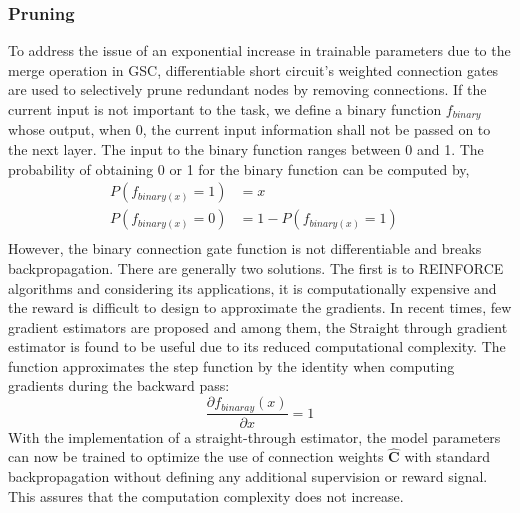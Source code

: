 \documentclass{article}
\let\oldhat\hat
\renewcommand{\hat}[1]{\oldhat{\mathbf{#1}}}
\begin{document}

\subsubsection{Pruning}
\label{sec:Pruning}
To address the issue of an exponential increase in trainable parameters due to the merge operation in GSC, differentiable short circuit's weighted connection gates are used to selectively prune redundant nodes by removing connections.  If the current input is not important to the task, we define a binary function $f_{binary}$ whose output, when 0, the current input information shall not be passed on to the next layer. The input to the binary function ranges between 0 and 1. The probability of obtaining 0 or 1 for the binary function can be computed by,
\begin{equation}
\label{eq:ffn_math_representation}
\begin{aligned}
   P(f_{binary(x)}=1) &=x&\\
   P(f_{binary(x)}=0) &=1-P(f_{binary(x)}=1)&\\   
\end{aligned}
\end{equation}
However, the binary connection gate function is not differentiable and breaks backpropagation. There are generally two solutions. The first is to REINFORCE algorithms \cite{Williams1992SimpleSG} and considering its applications, it is computationally expensive and the reward is difficult to design to approximate the gradients. In recent times, few gradient estimators are proposed and among them, the Straight through gradient estimator \cite{Bengio2013EstimatingOP} is found to be useful due to its reduced computational complexity. The function approximates the step function by the identity when computing gradients during the backward pass:
\begin{equation}
\frac{\partial{f_{binaray}(x)}}{\partial x}=1
\end{equation}
With the implementation of a straight-through estimator, the model parameters can now be trained to optimize the use of connection weights $\hat{C}$ with standard backpropagation without defining any additional supervision or reward signal. This assures that the computation complexity does not increase.
\end{document}
